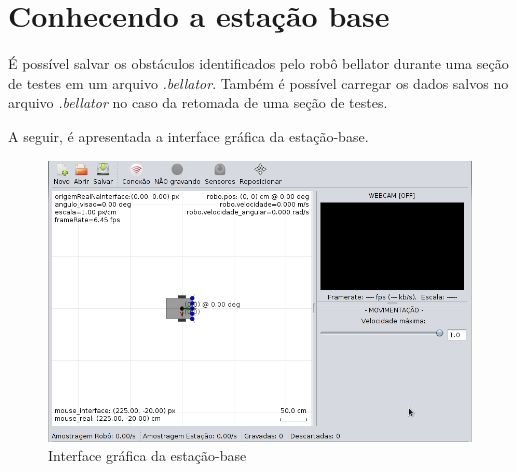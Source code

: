 


\chapter{Conhecendo a estação base}
É possível salvar os obstáculos identificados pelo robô bellator durante uma seção de testes em um arquivo \textit{.bellator}. Também é possível carregar os dados salvos no arquivo \textit{.bellator} no caso da retomada de uma seção de testes.

A seguir, é apresentada a interface gráfica da estação-base.

\begin{figure}[H]
\centering
\includegraphics[width=\textwidth]{./images/interface_grafica.png}
\caption{Interface gráfica da estação-base}
\label{fig:ui}
\end{figure}

